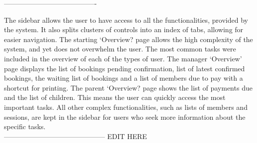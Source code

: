 \documentclass{l3proj}
\begin{document}
----------------------------------------
\par The sidebar allows the user to have access to all the functionalities, provided by the system. It also splits clusters of controls into an index of tabs, allowing for easier navigation. The starting `Overview? page allows the high complexity of the system, and yet does not overwhelm the user. The most common tasks were included in the overview of each of the types of user. The manager `Overview' page displays the list of bookings pending confirmation, list of latest confirmed bookings, the waiting list of bookings and a list of members due to pay with a shortcut for printing. The parent `Overview? page shows the list of payments due and the list of children. This means the user can quickly access the most important tasks. All other complex functionalities, such as lists of members and sessions, are kept in the sidebar for users who seek more information about the specific tasks.\\
--------------------------------------------
{\LARGE{EDIT HERE}}


\end{document}

